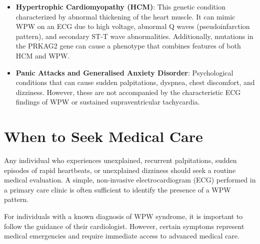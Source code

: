 \begin{itemize}
  \textbf{Mahaim Fiber Tachycardia}: This involves accessory pathways (Mahaim fibers) that typically connect the right atrium or AV node to the right bundle branch (atriofascicular pathways). They conduct slowly and only in the anterograde direction, producing an ECG with minor or no pre-excitation in sinus rhythm, but causing a wide-complex tachycardia with a left bundle branch block (LBBB) morphology when active.
  \item \textbf{Hypertrophic Cardiomyopathy (HCM)}: This genetic condition characterized by abnormal thickening of the heart muscle. It can mimic WPW on an ECG due to high voltage, abnormal Q waves (pseudoinfarction pattern), and secondary ST-T wave abnormalities. Additionally, mutations in the PRKAG2 gene can cause a phenotype that combines features of both HCM and WPW.
  \item \textbf{Panic Attacks and Generalised Anxiety Disorder}: Psychological conditions that can cause sudden palpitations, dyspnea, chest discomfort, and dizziness. However, these are not accompanied by the characteristic ECG findings of WPW or sustained supraventricular tachycardia.
\end{itemize}

\section*{When to Seek Medical Care}
Any individual who experiences unexplained, recurrent palpitations, sudden episodes of rapid heartbeats, or unexplained dizziness should seek a routine medical evaluation. A simple, non-invasive electrocardiogram (ECG) performed in a primary care clinic is often sufficient to identify the presence of a WPW pattern.

For individuals with a known diagnosis of WPW syndrome, it is important to follow the guidance of their cardiologist. However, certain symptoms represent medical emergencies and require immediate access to advanced medical care.

